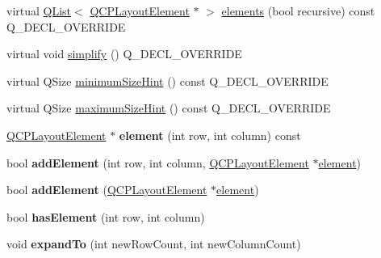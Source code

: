 \begin{DoxyCompactItemize}
\item 
virtual \hyperlink{class_q_list}{Q\+List}$<$ \hyperlink{class_q_c_p_layout_element}{Q\+C\+P\+Layout\+Element} $\ast$ $>$ \hyperlink{class_q_c_p_layout_grid_adc2b77187862688f52796d208bd9756c}{elements} (bool recursive) const Q\+\_\+\+D\+E\+C\+L\+\_\+\+O\+V\+E\+R\+R\+I\+DE
\item 
virtual void \hyperlink{class_q_c_p_layout_grid_a07841807e57ea5f6f0072250797defc0}{simplify} () Q\+\_\+\+D\+E\+C\+L\+\_\+\+O\+V\+E\+R\+R\+I\+DE
\item 
virtual Q\+Size \hyperlink{class_q_c_p_layout_grid_a57515592661621cc07d027867bcfc4de}{minimum\+Size\+Hint} () const Q\+\_\+\+D\+E\+C\+L\+\_\+\+O\+V\+E\+R\+R\+I\+DE
\item 
virtual Q\+Size \hyperlink{class_q_c_p_layout_grid_a22505c47e97c26621116072994e70cf3}{maximum\+Size\+Hint} () const Q\+\_\+\+D\+E\+C\+L\+\_\+\+O\+V\+E\+R\+R\+I\+DE
\item 
\mbox{\label{class_q_c_p_layout_grid_a3bbf5195611c9c4ad2be6acac00a081e}} 
\hyperlink{class_q_c_p_layout_element}{Q\+C\+P\+Layout\+Element} $\ast$ {\bfseries element} (int row, int column) const
\item 
\mbox{\label{class_q_c_p_layout_grid_adff1a2ca691ed83d2d24a4cd1fe17012}} 
bool {\bfseries add\+Element} (int row, int column, \hyperlink{class_q_c_p_layout_element}{Q\+C\+P\+Layout\+Element} $\ast$\hyperlink{class_q_c_p_layout_grid_a602b426609b4411cf6a93c3ddf3a381a}{element})
\item 
\mbox{\label{class_q_c_p_layout_grid_a4c44025dd25acd27e053cadfd448ad7b}} 
bool {\bfseries add\+Element} (\hyperlink{class_q_c_p_layout_element}{Q\+C\+P\+Layout\+Element} $\ast$\hyperlink{class_q_c_p_layout_grid_a602b426609b4411cf6a93c3ddf3a381a}{element})
\item 
\mbox{\label{class_q_c_p_layout_grid_ab0cf4f7edc9414a3bfaddac0f46dc0a0}} 
bool {\bfseries has\+Element} (int row, int column)
\item 
\mbox{\label{class_q_c_p_layout_grid_a886c0dcbabd51a45da399e044552b685}} 
void {\bfseries expand\+To} (int new\+Row\+Count, int new\+Column\+Count)
\item 
\mbox{\label{class_q_c_p_layout_grid_a48af3dd7c3a653d9c3d7dd99bd02e838}} 

\end{DoxyCompactItemize}
